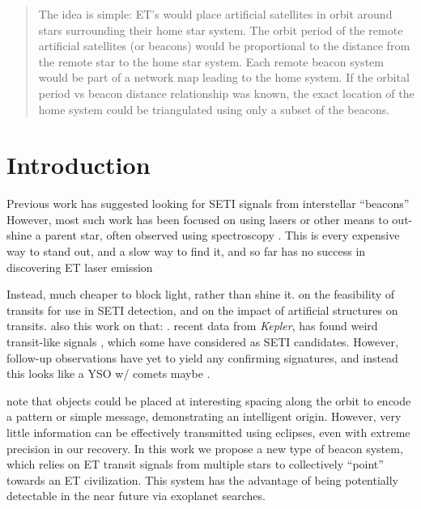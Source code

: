 \documentclass[]{openjournal}
\newcommand{\Kepler}{\textsl{Kepler}\xspace}
\begin{document}
\title{}

\shorttitle{}

\author{
	James R. A. Davenport
	}

 

\begin{abstract}
The idea is simple: ET's would place artificial satellites in orbit around stars surrounding their home star system. The orbit period of the remote artificial satellites (or beacons) would be proportional to the distance from the remote star to the home star system. Each remote beacon system would be part of a network map leading to the home system. If the orbital period vs beacon distance relationship was known, the exact location of the home system could be triangulated using only a subset of the beacons.
\end{abstract}

\section{Introduction}

Previous work has suggested looking for SETI signals from interstellar ``beacons''
\cite{benford2008}
However, most such work has been focused on using lasers or other means to out-shine a parent star, often observed using spectroscopy \cite{reines2002}. This is every expensive way to stand out, and a slow way to find it, and so far has no success in discovering ET laser emission \cite{tellis2015}


Instead, much cheaper to block light, rather than shine it.
\cite{arnold2005}
on the feasibility of transits for use in SETI detection, and 
\cite{arnold2005a}
on the impact of artificial structures on transits. also this work on that:
\cite{wright2016}.
recent data from \Kepler \citep{borucki2010}, has found weird transit-like signals
\cite{boyajian2015}, 
which some have considered as SETI candidates. However, follow-up observations have yet to yield any confirming signatures, and instead this looks like a YSO w/ comets maybe \citep{lisse2015}.


\cite{arnold2005} note that objects could be placed at interesting spacing along the orbit to encode a pattern or simple message, demonstrating an intelligent origin. However, very little information can be effectively transmitted using eclipses, even with extreme precision in our recovery.
In this work we propose a new type of beacon system, which relies on ET transit signals from multiple stars to collectively ``point'' towards an ET civilization. This system has the advantage of being potentially detectable in the near future via exoplanet searches.
\end{document}

